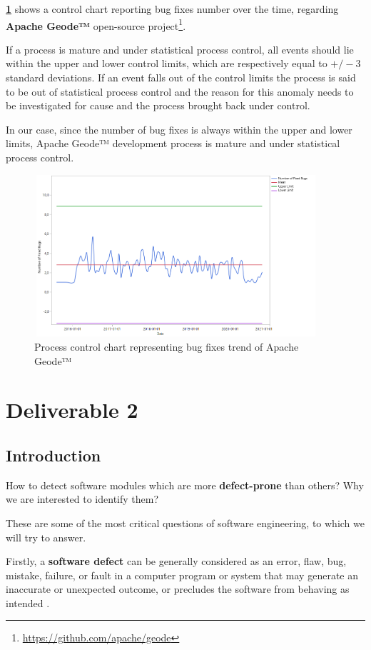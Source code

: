 \documentclass[sigconf]{acmart}
\begin{document}
\textbf{\cref{ProcessControl}} shows a control chart reporting bug fixes number over the time, regarding \textbf{Apache Geode™} open-source project\footnote{\url{https://github.com/apache/geode}}.

If a process is mature and under statistical process control, all events should lie within the upper and lower control limits, which are respectively equal to $+/-3$ standard deviations. If an event falls out of the control limits the process is said to be out of statistical process control and the reason for this anomaly needs to be investigated for cause and the process brought back under control. 

In our case, since the number of bug fixes is always within the upper and lower limits, Apache Geode™ development process is mature and under statistical process control.

\begin{figure}[h!]
  \centering
  \includegraphics[width=10.5cm, height=6cm]{./ProcessControlChart.png}
  \caption{Process control chart representing bug fixes trend of Apache Geode™}
  \label{ProcessControl}
\end{figure}

\section{Deliverable 2}

\subsection{Introduction}

How to detect software modules which are more \textbf{defect-prone} than others? Why we are interested to identify them? 

These are some of the most critical questions of software engineering, to which we will try to answer. 

Firstly, a \textbf{software defect} can be generally considered as an error, flaw, bug, mistake, failure, or fault in a computer program or system that may generate an inaccurate or unexpected outcome, or precludes the software from behaving as intended \cite{SoftwareDefectPredictionRawat}.
\end{document}
